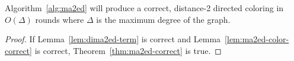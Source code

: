 \begin{thm} Algorithm~\ref{alg:ma2ed} will produce a correct, distance-2 directed coloring in $O(\Delta)$ rounds where $\Delta$ is the maximum degree of the graph.
\label{thm:ma2ed-correct}
\end{thm}

\begin{proof}



If Lemma~\ref{lem:dima2ed-term} is correct and Lemma~\ref{lem:ma2ed-color-correct} is correct, Theorem~\ref{thm:ma2ed-correct} is true.

\end{proof}
